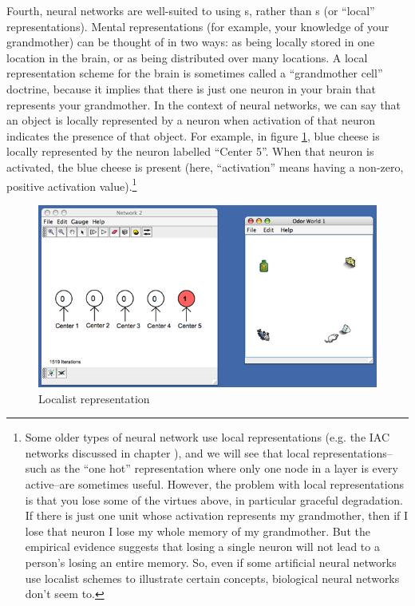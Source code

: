 Fourth, neural networks are well-suited to using s, rather than s (or ``local'' representations). Mental representations (for example, your knowledge of your grandmother) can be thought of in two ways: as being locally stored in one location in the brain, or as being distributed over many locations. A local representation scheme for the brain is sometimes called a ``grandmother cell'' doctrine, because it implies that there is just one neuron in your brain that represents your grandmother. In the context of neural networks, we can say that an object is locally represented by a neuron when activation of that neuron indicates the presence of that object. For example, in figure \ref{localist}, blue cheese is locally represented by the neuron labelled ``Center 5''. When that neuron is activated, the blue cheese is present (here, ``activation'' means having a non-zero, positive activation value).\footnote{Some older types of neural network use local representations (e.g. the IAC networks discussed in chapter ), and we will see that local representations--such as the ``one hot'' representation where only one node in a layer is every active--are sometimes useful. However, the problem with local representations is that you lose some of the virtues above, in particular graceful degradation. If there is just one unit whose activation represents my grandmother, then if I lose that neuron I lose my whole memory of my grandmother. But the empirical evidence suggests that losing a single neuron will not lead to a person's losing an entire memory. So, even if some artificial neural networks use localist schemes to illustrate certain concepts, biological neural networks don't seem to.}



\begin{figure}[h]
\centering
\includegraphics[scale=.3]{./images/Local_Rep.png}
\caption{Localist representation}
\label{localist}
\end{figure}

